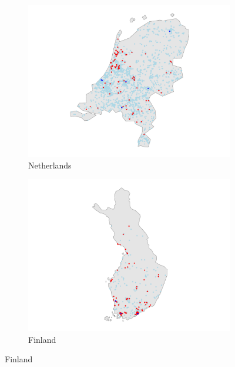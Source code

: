 \documentclass[12pt]{report}
\begin{document}
\begin{figure}[ht]
    \centering
    \begin{subfigure}[b]{0.5\textwidth}
        \centering
        \includegraphics[width=0.5\textheight]{../Output/NL_map.pdf}
        \caption{Netherlands}
        \label{fig:map_obs_NL}
    \end{subfigure}
    
    \vspace{1cm}
    
    \begin{subfigure}[b]{0.5\textwidth}
        \centering
        \includegraphics[width=0.5\textheight]{../Output/FI_map.pdf}
        \caption{Finland}  
        \label{fig:map_obs_FI}
    \end{subfigure}
\end{figure}
\end{document}
